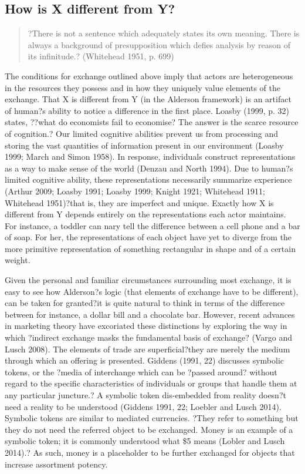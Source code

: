 \subsection{How is X different from Y?}
\begin{small}
\begin{quote}
?There is not a sentence which adequately states its own meaning. There is always a background of presupposition which defies analysis by reason of its infinitude.? (Whitehead 1951, p. 699)
\end{quote}
\end{small}

The conditions for exchange outlined above imply that actors are heterogeneous in the resources they possess and in how they uniquely value elements of the exchange. That X is different from Y (in the Alderson framework) is an artifact of human?s ability to notice a difference in the first place. Loasby (1999, p. 32) states, ??what do economists fail to economise? The answer is the scarce resource of cognition.? Our limited cognitive abilities prevent us from processing and storing the vast quantities of information present in our environment (Loasby 1999; March and Simon 1958). In response, individuals construct representations as a way to make sense of the world (Denzau and North 1994). Due to human?s limited cognitive ability, these representations necessarily summarize experience (Arthur 2009; Loasby 1991; Loasby 1999; Knight 1921; Whitehead 1911; Whitehead 1951)?that is, they are imperfect and unique. Exactly how X is different from Y depends entirely on the representations each actor maintains. For instance, a toddler can nary tell the difference between a cell phone and a bar of soap. For her, the representations of each object have yet to diverge from the more primitive representation of something rectangular in shape and of a certain weight. 

Given the personal and familiar circumstances surrounding most exchange, it is easy to see how Alderson?s logic (that elements of exchange have to be different), can be taken for granted?it is quite natural to think in terms of the difference between for instance, a dollar bill and a chocolate bar. However, recent advances in marketing theory have excoriated these distinctions by exploring the way in which ?indirect exchange masks the fundamental basis of exchange? (Vargo and Lusch 2008). The elements of trade are superficial?they are merely the medium through which an offering is presented. Giddens (1991, 22) discusses symbolic tokens, or the ?media of interchange which can be ?passed around? without regard to the specific characteristics of individuals or groups that handle them at any particular juncture.? A symbolic token dis-embedded from reality doesn?t need a reality to be understood (Giddens 1991, 22; Loebler and Lusch 2014). Symbolic tokens are similar to mediated currencies. ?They refer to something but they do not need the referred object to be exchanged. Money is an example of a symbolic token; it is commonly understood what \$5 means (Lobler and Lusch 2014).? As such, money is a placeholder to be further exchanged for objects that increase assortment potency. 

